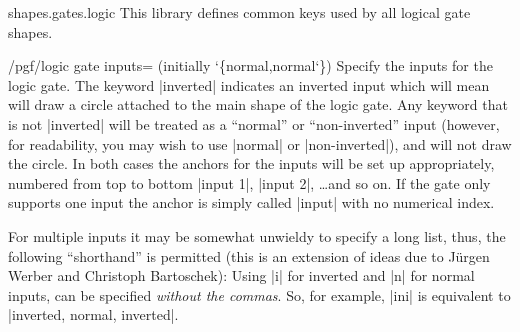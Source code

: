 \begin{pgflibrary}{shapes.gates.logic}
    This library defines common keys used by all logical gate shapes.

    \begin{key}{/pgf/logic gate inputs= (initially \char`\{normal,normal\char`\})}
    \label{logic-gate-inputs}%
        Specify the inputs for the logic gate. The keyword |inverted| indicates
        an inverted input which will mean \pgfname{} will draw a circle
        attached to the main shape of the logic gate. Any keyword that is not
        |inverted| will be treated as a ``normal'' or ``non-inverted'' input
        (however, for readability, you may wish to use |normal| or
        |non-inverted|), and \pgfname{} will not draw the circle. In both cases
        the anchors for the inputs will be set up appropriately, numbered from
        top to bottom |input 1|, |input 2|, \ldots and so on. If the gate only
        supports one input the anchor is simply called |input| with no
        numerical index.
\begin{codeexample}[preamble={\usetikzlibrary{circuits.logic.IEC}}]
\end{codeexample}

        For multiple inputs it may be somewhat unwieldy to specify a long list,
        thus, the following ``shorthand'' is permitted (this is an extension of
        ideas due to Jürgen Werber and Christoph Bartoschek): Using |i| for
        inverted and |n| for normal inputs,  can be specified
        \emph{without the commas}. So, for example, |ini| is equivalent to
        |inverted, normal, inverted|.
\begin{codeexample}[preamble={\usetikzlibrary{circuits.logic.US}}]
\end{codeexample}
    \end{key}


\end{pgflibrary}
